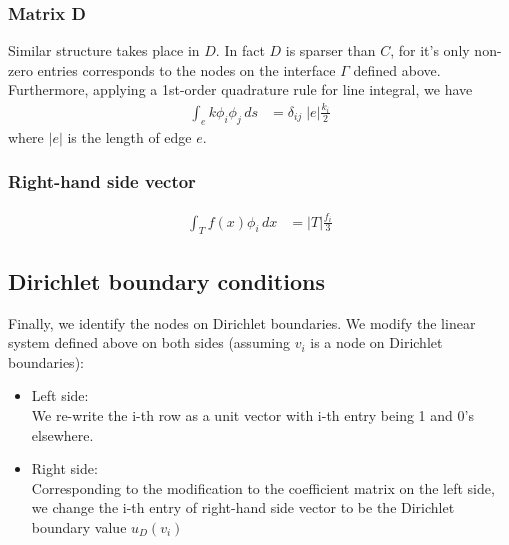\documentclass{article}
\begin{document}
 \subsubsection{Matrix D}
 Similar structure takes place in $D$. In fact $D$ is sparser than $C$, for it's only non-zero entries corresponds to
 the nodes on the interface $\Gamma$ defined above. Furthermore, applying a 1st-order quadrature rule for line 
 integral, we have 
 \begin{align}
  \int_e k\phi_i \phi_j \, ds 
  &= \delta_{ij}\; |e| \frac{k_i}{2}
 \end{align}
 where $|e|$ is the length of edge $e$.
 
 \subsubsection{Right-hand side vector}
 \begin{align}
  \int_T f(x) \phi_i \, dx
  &= |T| \frac{f_i}{3}
 \end{align}
 
 
 
 
 \subsection{Dirichlet boundary conditions}
 Finally, we identify the nodes on Dirichlet boundaries. We modify the linear system defined above on both sides
 (assuming $v_i$ is a node on Dirichlet boundaries):
 \begin{itemize}
  \item Left side:\\
  We re-write the i-th row as a unit vector with i-th entry being 1 and
  0's elsewhere.
  \item Right side:\\
  Corresponding to the modification to the coefficient matrix on the left side, we change the i-th entry of right-hand 
  side vector to be the Dirichlet boundary value $u_D(v_i)$
 \end{itemize}
\end{document}
